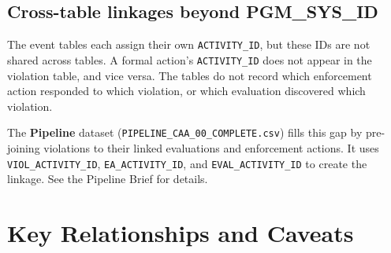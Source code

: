 \documentclass[11pt]{article}
\begin{document}
\subsection*{Cross-table linkages beyond PGM\_SYS\_ID}

The event tables each assign their own \texttt{ACTIVITY\_ID}, but these IDs are not shared across tables. A formal action's \texttt{ACTIVITY\_ID} does not appear in the violation table, and vice versa. The tables do not record which enforcement action responded to which violation, or which evaluation discovered which violation.

The \textbf{Pipeline} dataset (\texttt{PIPELINE\_CAA\_00\_COMPLETE.csv}) fills this gap by pre-joining violations to their linked evaluations and enforcement actions. It uses \texttt{VIOL\_ACTIVITY\_ID}, \texttt{EA\_ACTIVITY\_ID}, and \texttt{EVAL\_ACTIVITY\_ID} to create the linkage. See the Pipeline Brief for details.

\section{Key Relationships and Caveats}
\end{document}
